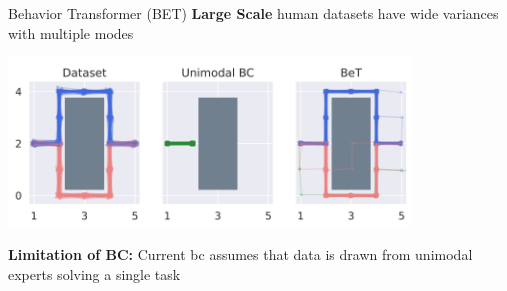 \documentclass{beamer}
\begin{document}
\begin{frame}[t]{Behavior Transformer (BET)}
    \textbf{Large Scale} human datasets have wide variances with multiple modes
    \begin{center}
        \includegraphics[width=0.8\textwidth]{./img/bet.png}
    \end{center}
    \textbf{Limitation of BC:} Current bc assumes that data is drawn from unimodal experts solving a single task
\end{frame}
\end{document}
